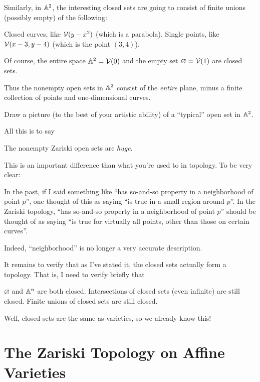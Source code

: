 \begin{example}
	Similarly, in $\mathbb A^2$, the interesting closed sets are going to consist of finite unions
	(possibly empty) of the following:
	\begin{itemize}
		\ii Closed curves, like $\mathcal V(y-x^2)$ (which is a parabola).
		\ii Single points, like $\mathcal V(x-3,y-4)$ (which is the point $(3,4)$).
	\end{itemize}
	Of course, the entire space $\mathbb A^2 = \mathcal V(0)$ and the empty set $\varnothing = \mathcal V(1)$
	are closed sets.

	Thus the nonempty open sets in $\mathbb A^2$ consist of the \emph{entire} plane,
	minus a finite collection of points and one-dimensional curves.
\end{example}
\begin{ques}
	Draw a picture (to the best of your artistic ability) of a ``typical''
	open set in $\mathbb A^2$.
\end{ques}

All this is to say
\begin{moral}
	The nonempty Zariski open sets are \emph{huge}.
\end{moral}
This is an important difference than what you're used to in topology.
To be very clear:
\begin{itemize}
	\ii In the past, if I said something like ``has so-and-so property in a neighborhood of point $p$'',
	one thought of this as saying ``is true in a small region around $p$''.
	\ii In the Zariski topology, ``has so-and-so property in a neighborhood of point $p$'' should be thought
	of as saying ``is true for virtually all points, other than those on certain curves''.
\end{itemize}
Indeed, ``neighborhood'' is no longer a very accurate description.

It remains to verify that as I've stated it, the closed sets actually form a topology.
That is, I need to verify briefly that
\begin{itemize}
	\ii $\varnothing$ and $\mathbb A^n$ are both closed.
	\ii Intersections of closed sets (even infinite) are still closed.
	\ii Finite unions of closed sets are still closed.
\end{itemize}
Well, closed sets are the same as varieties, so we already know this!

\section{The Zariski Topology on Affine Varieties}

